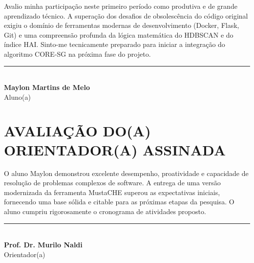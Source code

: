 \documentclass[12pt,a4paper]{article}
\begin{document}
Avalio minha participação neste primeiro período como produtiva e de grande aprendizado técnico. A superação dos desafios de obsolescência do código original exigiu o domínio de ferramentas modernas de desenvolvimento (Docker, Flask, Git) e uma compreensão profunda da lógica matemática do HDBSCAN e do índice HAI. Sinto-me tecnicamente preparado para iniciar a integração do algoritmo CORE-SG na próxima fase do projeto.

\vspace{1.5cm}
\begin{center}
    \rule{10cm}{0.5pt}\\
    \textbf{Maylon Martins de Melo}\\
    Aluno(a)
\end{center}

\section{AVALIAÇÃO DO(A) ORIENTADOR(A) ASSINADA}

O aluno Maylon demonstrou excelente desempenho, proatividade e capacidade de resolução de problemas complexos de software. A entrega de uma versão modernizada da ferramenta MustaCHE superou as expectativas iniciais, fornecendo uma base sólida e citable para as próximas etapas da pesquisa. O aluno cumpriu rigorosamente o cronograma de atividades proposto.

\vspace{1.5cm}
\begin{center}
    \rule{10cm}{0.5pt}\\
    \textbf{Prof. Dr. Murilo Naldi}\\
    Orientador(a)
\end{center}
\end{document}
